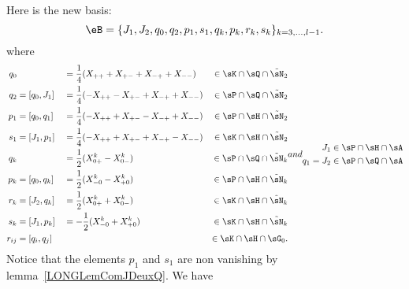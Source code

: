 Here is the new basis:
%
\begin{equation}		\label{LONGEqSuperBaseeB}
	\eB=\{J_1,J_2, q_0,q_2,p_1,s_1,q_k,p_k,r_k,s_k \}_{k=3,\ldots,l-1}.
\end{equation}
%
where
\begin{subequations}		\label{LONGSubEqsBaseSuperTsNTrois}\label{LONGEqDecompqprskXX}
	\begin{align}
		q_0    &            &  & =\frac{1}{ 4 }(X_{++}+X_{+-}+X_{-+}+X_{--})  & \in\sK\cap\sQ\cap\tilde\sN_2                         \\
		q_2    & =[q_0,J_1] &  & =\frac{1}{ 4 }(-X_{++}-X_{+-}+X_{-+}+X_{--}) & \in\sP\cap\sQ\cap\tilde\sN_2                         \\
		p_1    & =[q_0,q_1] &  & =\frac{1}{ 4 }(-X_{++}+X_{+-}-X_{-+}+X_{--}) & \in\sP\cap\sH\cap\tilde\sN_2	\label{LONGEqqzqupuDef} \\
		s_1    & =[J_1,p_1] &  & =\frac{1}{ 4 }(-X_{++}+X_{+-}+X_{-+}-X_{--}) & \in\sK\cap\sH\cap\tilde\sN_2                         \\
		q_k    &            &  & =\frac{ 1 }{2}(X_{0+}^k-X_{0-}^k)            & \in\sP\cap\sQ\cap\tilde\sN_k                         \\
		p_k    & =[q_0,q_k] &  & =\frac{ 1 }{ 2 }(X_{-0}^k-X_{+0}^k)          & \in\sP\cap\sH\cap\tilde\sN_k                         \\
		r_k    & =[J_2,q_k] &  & =\frac{ 1 }{2}(X^k_{0+}+X^k_{0-})            & \in\sK\cap\sH\cap\tilde\sN_k                         \\
		s_k    & =[J_1,p_k] &  & =-\frac{ 1 }{2}(X^k_{-0}+X^k_{+0})           & \in\sK\cap\sH\cap\tilde\sN_k                         \\
		r_{ij} & =[q_i,q_j] &  &                                              & \in\sK\cap\sH\cap\sG_0.
	\end{align}
	and
	\begin{align}
		J_1     & \in\sP\cap\sH\cap\sA \\
		q_1=J_2 & \in\sP\cap\sQ\cap\sA
	\end{align}
\end{subequations}
Notice that the elements $p_1$ and $s_1$ are non vanishing by lemma~\ref{LONGLemComJDeuxQ}. We have
